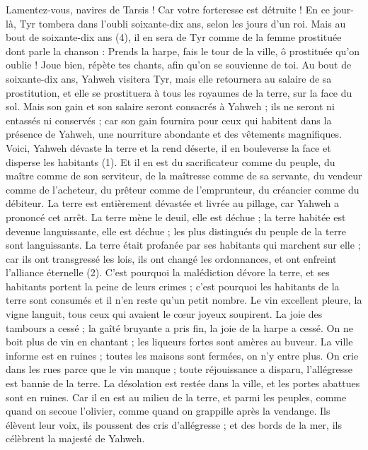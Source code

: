 \begin{multicols}{2}
{Lamentez-vous, navires de Tarsis ! Car votre forteresse est détruite !
En ce jour-là, Tyr tombera dans l’oubli soixante-dix ans, selon les jours d'un roi. Mais au bout de soixante-dix ans (4), il en sera de Tyr comme de la femme prostituée dont parle la chanson :
Prends la harpe, fais le tour de la ville, ô prostituée qu’on oublie ! Joue bien, répète tes chants, afin qu'on se souvienne de toi.
Au bout de soixante-dix ans, Yahweh visitera Tyr, mais elle retournera au salaire de sa prostitution, et elle se prostituera à tous les royaumes de la terre, sur la face du sol.
Mais son gain et son salaire seront consacrés à Yahweh ; ils ne seront ni entassés ni conservés ; car son gain fournira pour ceux qui habitent dans la présence de Yahweh, une nourriture abondante et des vêtements magnifiques.
\VerseOne{}Voici, Yahweh dévaste la terre et la rend déserte, il en bouleverse la face et disperse les habitants (1).
Et il en est du sacrificateur comme du peuple, du maître comme de son serviteur, de la maîtresse comme de sa servante, du vendeur comme de l'acheteur, du prêteur comme de l’emprunteur, du créancier comme du débiteur.
La terre est entièrement dévastée et livrée au pillage, car Yahweh a prononcé cet arrêt.
La terre mène le deuil, elle est déchue ; la terre habitée est devenue languissante, elle est déchue ; les plus distingués du peuple de la terre sont languissants.
La terre était profanée par ses habitants qui marchent sur elle ; car ils ont transgressé les lois, ils ont changé les ordonnances, et ont enfreint l'alliance éternelle (2).
C'est pourquoi la malédiction dévore la terre, et ses habitants portent la peine de leurs crimes ; c’est pourquoi les habitants de la terre sont consumés et il n’en reste qu’un petit nombre.
Le vin excellent pleure, la vigne languit, tous ceux qui avaient le cœur joyeux soupirent.
La joie des tambours a cessé ; la gaîté bruyante a pris fin, la joie de la harpe a cessé.
On ne boit plus de vin en chantant ; les liqueurs fortes sont amères au buveur.
La ville informe est en ruines ; toutes les maisons sont fermées, on n’y entre plus.
On crie dans les rues parce que le vin manque ; toute réjouissance a disparu, l'allégresse est bannie de la terre.
La désolation est restée dans la ville, et les portes abattues sont en ruines.
Car il en est au milieu de la terre, et parmi les peuples, comme quand on secoue l'olivier, comme quand on grappille après la vendange.
Ils élèvent leur voix, ils poussent des cris d’allégresse ; et des bords de la mer, ils célèbrent la majesté de Yahweh.
}
\end{multicols}
